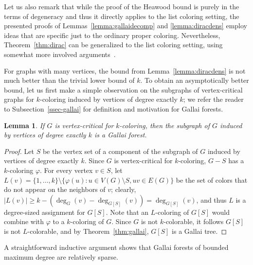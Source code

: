 \documentclass[12pt,twoside,openright,a4paper]{book}
\newtheorem{lemma}[theorem]{Lemma}
\begin{document}
Let us also remark that while the proof of the Heawood bound is purely in the terms of degeneracy and thus it directly
applies to the list coloring setting, the presented proofs of Lemmas~\ref{lemma:gallaidecomp} and \ref{lemma:diracdens}
employ ideas that are specific just to the ordinary proper coloring.  Nevertheless, Theorem~\ref{thm:dirac} can be generalized
to the list coloring setting, using somewhat more involved arguments~\cite{bohmelc,listdir2}.

For graphs with many vertices, the bound from Lemma~\ref{lemma:diracdens} is not much better than the trivial lower bound of $k$.
To obtain an asymptotically better bound, let us first make a simple observation on the subgraphs of vertex-critical graphs for $k$-coloring induced by vertices
of degree exactly $k$; we refer the reader to Subsection~\ref{ssec-gallai} for definition and motivation for Gallai forests.

\begin{lemma}\label{lemma:degkgal}
If $G$ is vertex-critical for $k$-coloring, then the subgraph of $G$ induced by vertices of degree exactly $k$
is a Gallai forest.
\end{lemma}
\begin{proof}
Let $S$ be the vertex set of a component of the subgraph of $G$ induced by vertices of degree exactly $k$.
Since $G$ is vertex-critical for $k$-coloring, $G-S$ has a $k$-coloring $\varphi$.  For every vertex $v\in S$,
let $L(v)=\{1,\ldots,k\}\setminus\{\varphi(u):u\in V(G)\setminus S, uv\in E(G)\}$ be the set of colors that do
not appear on the neighbors of $v$; clearly, $|L(v)|\ge k-(\deg_G(v)-\deg_{G[S]}(v))=\deg_{G[S]}(v)$,
and thus $L$ is a degree-sized assignment for $G[S]$.  Note that an $L$-coloring of $G[S]$ would combine
with $\varphi$ to a $k$-coloring of $G$.  Since $G$ is not $k$-colorable, it follows $G[S]$ is not $L$-colorable,
and by Theorem~\ref{thm:gallai}, $G[S]$ is a Gallai tree.
\end{proof}

A straightforward inductive argument shows that Gallai forests of bounded maximum degree are relatively sparse.
\end{document}
